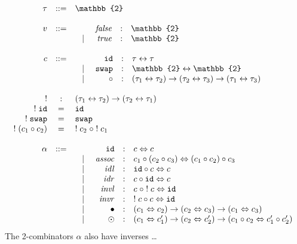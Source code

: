 \documentclass[format=acmlarge,review,natbib]{acmart}
\newcommand{\swap}{\texttt{swap}}
\newcommand{\id}{\texttt{id}}
\newcommand{\compc}[2]{#1 \circ #2}
\newcommand{\alt}{~\mid~}
\newcommand{\invc}[1]{!\;#1}
\newcommand{\assocc}{\mathit{assoc}}
\newcommand{\invl}{\mathit{invl}}
\newcommand{\invr}{\mathit{invr}}
\newcommand{\idlc}{\mathit{idl}}
\newcommand{\idrc}{\mathit{idr}}
\newcommand{\iso}{\leftrightarrow}
\newcommand{\isotwo}{\Leftrightarrow}
\newcommand{\fc}{\mathit{false}}
\newcommand{\tc}{\mathit{true}}
\begin{document}
\[\begin{array}{rcl}
\tau &::=& \mathbb{2} \\
\\
v &::=& \begin{array}[t]{lrcl}
                    & \fc &:& \mathbb{2} \\
              \alt & \tc &:& \mathbb{2}
               \end{array} \\
\\
c &::=& \begin{array}[t]{lrcl}
              & \id &:& \tau \iso \tau \\
               \alt & \swap &:& \mathbb{2} \iso \mathbb{2} \\
               \alt & \circ &:& (\tau_1 \iso \tau_2) \rightarrow (\tau_2 \iso \tau_3)
                              \rightarrow (\tau_1 \iso \tau_3)
               \end{array} \\
\\
! &:& (\tau_1 \iso \tau_2) \rightarrow (\tau_2 \iso \tau_1) \\
\invc{\id} &=& \id \\
\invc{\swap} &=& \swap \\
\invc{(\compc{c_1}{c_2})} &=& \compc{\invc{c_2}\;}{\;\invc{c_1}} \\
\\
\alpha &::=& \begin{array}[t]{lrcl}
               & \id &:& c \isotwo c \\
               \alt & \assocc &:& \compc{c_1}{(\compc{c_2}{c_3})} \isotwo
                                              \compc{(\compc{c_1}{c_2})}{c_3} \\
               \alt & \idlc &:& \compc{\id}{c} \isotwo c \\
               \alt & \idrc &:& \compc{c}{\id} \isotwo c \\
               \alt & \invl &:& \compc{c\;}{\;\invc{c}} \isotwo \id \\
               \alt & \invr &:& \compc{\invc{c}}{c} \isotwo \id \\
               \alt & \bullet &:& (c_1 \isotwo c_2) \rightarrow (c_2 \isotwo c_3)
                                            \rightarrow (c_1 \isotwo c_3) \\
               \alt & \odot &:& (c_1 \isotwo c_1') \rightarrow (c_2 \isotwo c_2')
                                            \rightarrow (\compc{c_1}{c_2} \isotwo \compc{c_1'}{c_2'}) \\
             \end{array}
\end{array}\]
The 2-combinators $\alpha$ also have inverses \ldots
\end{document}
